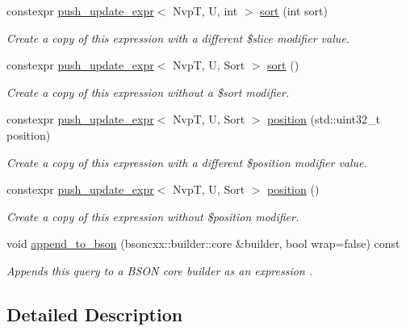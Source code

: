 \begin{DoxyCompactItemize}
constexpr \hyperlink{classmangrove_1_1push__update__expr}{push\+\_\+update\+\_\+expr}$<$ NvpT, U, int $>$ \hyperlink{classmangrove_1_1push__update__expr_a04ec8ecfa3bc35b00aa9763befa6b41e}{sort} (int sort)
\begin{DoxyCompactList}\small\item\em Create a copy of this expression with a different \$slice modifier value. \end{DoxyCompactList}\item 
constexpr \hyperlink{classmangrove_1_1push__update__expr}{push\+\_\+update\+\_\+expr}$<$ NvpT, U, Sort $>$ \hyperlink{classmangrove_1_1push__update__expr_aa82b7e360956010ebb0b30182a488840}{sort} ()
\begin{DoxyCompactList}\small\item\em Create a copy of this expression without a \$sort modifier. \end{DoxyCompactList}\item 
constexpr \hyperlink{classmangrove_1_1push__update__expr}{push\+\_\+update\+\_\+expr}$<$ NvpT, U, Sort $>$ \hyperlink{classmangrove_1_1push__update__expr_ae4ee751327e25ba7063174305907db41}{position} (std\+::uint32\+\_\+t position)
\begin{DoxyCompactList}\small\item\em Create a copy of this expression with a different \$position modifier value. \end{DoxyCompactList}\item 
constexpr \hyperlink{classmangrove_1_1push__update__expr}{push\+\_\+update\+\_\+expr}$<$ NvpT, U, Sort $>$ \hyperlink{classmangrove_1_1push__update__expr_aed6d97c431d4c123f9e3cfa2889a8b20}{position} ()
\begin{DoxyCompactList}\small\item\em Create a copy of this expression without \$position modifier. \end{DoxyCompactList}\item 
void \hyperlink{classmangrove_1_1push__update__expr_ab812da4ac605cf10b90ef5c1e7c429a3}{append\+\_\+to\+\_\+bson} (bsoncxx\+::builder\+::core \&builder, bool wrap=false) const 
\begin{DoxyCompactList}\small\item\em Appends this query to a B\+S\+ON core builder as an expression \textquotesingle{}. \end{DoxyCompactList}\end{DoxyCompactItemize}


\subsection{Detailed Description}
